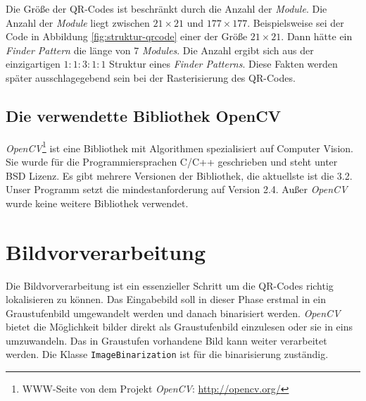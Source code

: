 Die Größe der QR-Codes ist beschränkt durch die Anzahl der \emph{Module}. Die Anzahl der \emph{Module} liegt zwischen $21 \times 21$ und $177 \times 177$. Beispielsweise sei der Code in Abbildung \ref{fig:struktur-qrcode} einer der Größe $21 \times 21$. Dann hätte ein \emph{Finder Pattern} die länge von $7$ \emph{Modules}. Die Anzahl ergibt sich aus der einzigartigen $1:1:3:1:1$ Struktur eines \emph{Finder Patterns}. Diese Fakten werden später ausschlagegebend sein bei der Rasterisierung des QR-Codes.

\section{Die verwendette Bibliothek OpenCV}
\emph{OpenCV}\footnote{WWW-Seite von dem Projekt \emph{OpenCV}: \url{http://opencv.org/}} ist eine Bibliothek mit Algorithmen spezialisiert auf \glqq Computer Vision\grqq . Sie wurde für die Programmiersprachen C/C++ geschrieben und steht unter BSD Lizenz. Es gibt mehrere Versionen der Bibliothek, die aktuellste ist die 3.2. Unser Programm setzt  die mindestanforderung auf Version 2.4. Außer \emph{OpenCV} wurde keine weitere Bibliothek verwendet. 



\chapter{Bildvorverarbeitung}
Die Bildvorverarbeitung ist ein essenzieller Schritt um die QR-Codes richtig lokalisieren zu können. Das Eingabebild soll in dieser Phase erstmal in ein Graustufenbild umgewandelt werden und danach binarisiert werden. \emph{OpenCV} bietet die Möglichkeit bilder direkt als Graustufenbild einzulesen oder sie in eins umzuwandeln. Das in Graustufen vorhandene Bild kann weiter verarbeitet werden.
Die Klasse \texttt{ImageBinarization} ist für die binarisierung zuständig. 

